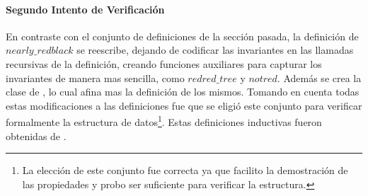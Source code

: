 \paragraph{Segundo Intento de Verificaci\'on}
En contraste con el conjunto de definiciones de la secci\'on pasada, la definici\'on de
$nearly\_redblack$ se reescribe, dejando de codificar las invariantes en las llamadas recursivas
de la definición, creando funciones auxiliares para capturar los invariantes de manera mas
sencilla, como $redred\_tree$ y $notred$. Además se crea la clase de {\arns}, lo cual afina mas la
definici\'on de los mismos. Tomando en cuenta todas estas modificaciones a las definiciones fue que
se eligió este conjunto para verificar formalmente la estructura de datos\footnote{La elecci\'on
de este conjunto fue correcta ya que facilito la demostraci\'on de las propiedades y probo ser
suficiente para verificar la estructura.}.
Estas definiciones inductivas fueron obtenidas de \cite{MSetRBT}.
